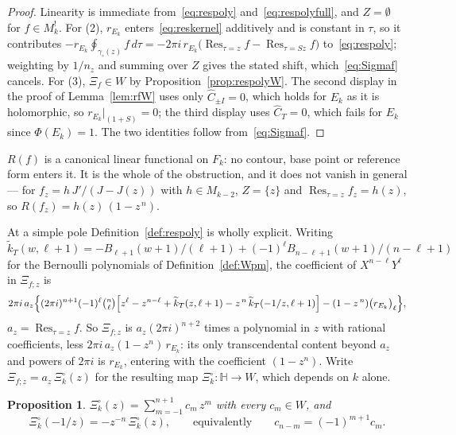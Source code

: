 \documentclass[11pt]{article}
\newtheorem{proposition}[theorem]{Proposition}
\newcommand{\HH}{\mathbb{H}}
\newcommand{\tk}{\widetilde{k}_T}
\DeclareMathOperator{\Res}{Res}
\begin{document}
\begin{proof}
Linearity is immediate from~\eqref{eq:respoly} and~\eqref{eq:respolyfull}, and $Z=\emptyset$ for
$f\in M^!_k$. For (2), $r_{E_k}$ enters~\eqref{eq:reskernel} additively and is constant in $\tau$,
so it contributes $-r_{E_k}\oint_{\gamma_\circ(z)}f\,d\tau
=-2\pi i\,r_{E_k}\big(\Res_{\tau=z}f-\Res_{\tau=Sz}f\big)$ to~\eqref{eq:respoly};
weighting by $1/n_z$ and summing over $Z$ gives the stated shift, which~\eqref{eq:Sigmaf} cancels.
For (3), $\Xi_f\in W$ by Proposition~\ref{prop:respolyW}. The second display in the proof of
Lemma~\ref{lem:rfW} uses only $\hat C_{\pm I}=0$, which holds for $E_k$ as it is holomorphic, so
$r_{E_k}|_{(1+S)}=0$; the third display uses $\hat C_T=0$, which fails for $E_k$ since
$\Phi(E_k)=1$. The two identities follow from~\eqref{eq:Sigmaf}.
\end{proof}

$R(f)$ is a canonical linear functional on $F_k$: no contour, base point or reference form enters
it. It is the whole of the obstruction, and it does not vanish in general --- for
$f_z=h\,J'/(J-J(z))$ with $h\in M_{k-2}$, $Z=\{z\}$ and $\Res_{\tau=z}f_z=h(z)$, so
$R(f_z)=h(z)\,(1-z^{\,n})$.

At a simple pole Definition~\ref{def:respoly} is wholly explicit. Writing
$\tk(w,\ell+1)=-B_{\ell+1}(w+1)/(\ell+1)+(-1)^\ell B_{n-\ell+1}(w+1)/(n-\ell+1)$ for the Bernoulli
polynomials of Definition~\ref{def:Wpm}, the coefficient of $X^{n-\ell}Y^\ell$ in $\Xi_{f;z}$ is
\begin{equation}\label{eq:respolyexp}
2\pi i\,a_z\Big\{(2\pi i)^{n+1}(-1)^\ell\tbinom{n}{\ell}
\Big[z^\ell-z^{n-\ell}+\tk(z,\ell+1)-z^{\,n}\,\tk(-1/z,\ell+1)\Big]
-(1-z^{\,n})\big(r_{E_k}\big)_\ell\Big\},
\end{equation}
$a_z=\Res_{\tau=z}f$. So $\Xi_{f;z}$ is $a_z(2\pi i)^{n+2}$ times a polynomial in $z$ with rational
coefficients, less $2\pi i\,a_z(1-z^n)\,r_{E_k}$: its only transcendental content beyond $a_z$ and
powers of $2\pi i$ is $r_{E_k}$, entering with the coefficient $(1-z^n)$. Write
$\Xi_{f;z}=a_z\,\Xi^\circ_k(z)$ for the resulting map $\Xi^\circ_k:\HH\to W$, which depends on $k$ alone.

\begin{proposition}\label{prop:thetalaurent}
$\Xi^\circ_k(z)=\sum_{m=-1}^{n+1}c_m\,z^m$ with every $c_m\in W$, and
\begin{equation}\label{eq:thetafe}
\Xi^\circ_k(-1/z)=-z^{-n}\,\Xi^\circ_k(z),\qquad\text{equivalently}\qquad c_{n-m}=(-1)^{m+1}c_m .
\end{equation}
\end{proposition}
\end{document}
